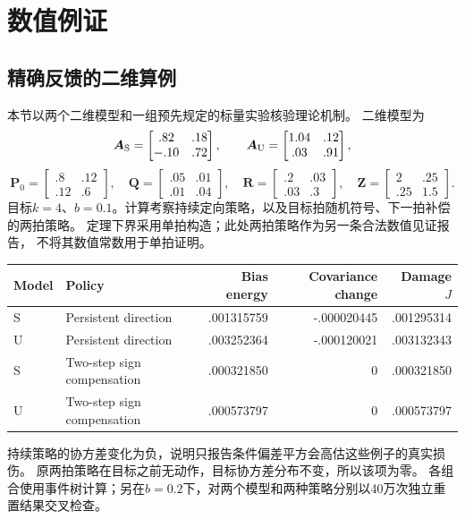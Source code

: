 \section{数值例证}
\subsection{精确反馈的二维算例}
本节以两个二维模型和一组预先规定的标量实验核验理论机制。
二维模型为
\[
{\bm{A}}_{\rm S}=\begin{bmatrix}.82&.18\\-.10&.72\end{bmatrix},\qquad
{\bm{A}}_{\rm U}=\begin{bmatrix}1.04&.12\\.03&.91\end{bmatrix},
\]
\[
{\bm{P}}_0=\begin{bmatrix}.8&.12\\.12&.6\end{bmatrix},\quad
{\bm{Q}}=\begin{bmatrix}.05&.01\\.01&.04\end{bmatrix},\quad
{\bm{R}}=\begin{bmatrix}.2&.03\\.03&.3\end{bmatrix},\quad
{\bm{Z}}=\begin{bmatrix}2&.25\\.25&1.5\end{bmatrix}.
\]
目标$k=4$、$b=0.1$。计算考察持续定向策略，以及目标拍随机符号、下一拍补偿的两拍策略。
定理下界采用单拍构造；此处两拍策略作为另一条合法数值见证报告，
不将其数值常数用于单拍证明。

\begin{table}[ht]
\centering\footnotesize
{}
\begin{tabular}{llrrr}
\toprule
Model & Policy & Bias energy & Covariance change & Damage $J$\\
\midrule
S & Persistent direction & .001315759 & -.000020445 & .001295314\\
U & Persistent direction & .003252364 & -.000120021 & .003132343\\
S & Two-step sign compensation & .000321850 & 0 & .000321850\\
U & Two-step sign compensation & .000573797 & 0 & .000573797\\
\bottomrule
\end{tabular}
\end{table}
持续策略的协方差变化为负，说明只报告条件偏差平方会高估这些例子的真实损伤。
原两拍策略在目标之前无动作，目标协方差分布不变，所以该项为零。
各组合使用事件树计算；另在$b=0.2$下，对两个模型和两种策略分别以40万次独立重置结果交叉检查。

